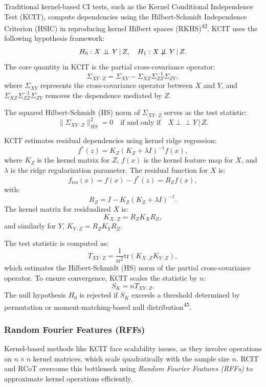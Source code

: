 \documentclass[
]{article}
\begin{document}
Traditional kernel-based CI tests, such as the Kernel Conditional
Independence Test (KCIT), compute dependencies using the Hilbert-Schmidt
Independence Criterion (HSIC) in reproducing kernel Hilbert spaces
(RKHS)\textsuperscript{42}. KCIT uses the following hypothesis
framework: \[
H_0: X \perp\!\!\!\perp Y \,|\, Z, \quad H_1: X \not\!\perp\!\!\!\perp Y \,|\, Z.
\] The core quantity in KCIT is the partial cross-covariance operator:
\[
\Sigma_{XY \cdot Z} = \Sigma_{XY} - \Sigma_{XZ} \Sigma_{ZZ}^{-1} \Sigma_{ZY},
\] where \(\Sigma_{XY}\) represents the cross-covariance operator
between \(X\) and \(Y\), and
\(\Sigma_{XZ} \Sigma_{ZZ}^{-1} \Sigma_{ZY}\) removes the dependence
mediated by \(Z\).

The squared Hilbert-Schmidt (HS) norm of \(\Sigma_{XY \cdot Z}\) serves
as the test statistic: \[
\|\Sigma_{XY \cdot Z}\|^2_{HS} = 0 \quad \text{if and only if} \quad X \perp\!\!\!\perp Y \,|\, Z.
\]

KCIT estimates residual dependencies using kernel ridge regression: \[
f^*(z) = K_Z (K_Z + \lambda I)^{-1} f(x),
\] where \(K_Z\) is the kernel matrix for \(Z\), \(f(x)\) is the kernel
feature map for \(X\), and \(\lambda\) is the ridge regularization
parameter. The residual function for \(X\) is: \[
f_\text{res}(x) = f(x) - f^*(z) = R_Z f(x),
\] with: \[
R_Z = I - K_Z (K_Z + \lambda I)^{-1}.
\] The kernel matrix for residualized \(X\) is: \[
K_{X \cdot Z} = R_Z K_X R_Z,
\] and similarly for \(Y\), \(K_{Y \cdot Z} = R_Z K_Y R_Z\).

The test statistic is computed as: \[
T_{XY \cdot Z} = \frac{1}{n^2} \text{tr}(K_{X \cdot Z} K_{Y \cdot Z}),
\] which estimates the Hilbert-Schmidt (HS) norm of the partial
cross-covariance operator. To ensure convergence, KCIT scales the
statistic by \(n\): \[
S_K = n T_{XY \cdot Z}.
\] The null hypothesis \(H_0\) is rejected if \(S_K\) exceeds a
threshold determined by permutation or moment-matching-based null
distribution\textsuperscript{45}.

\subsubsection{Random Fourier Features
(RFFs)}\label{random-fourier-features-rffs}

Kernel-based methods like KCIT face scalability issues, as they involve
operations on \(n \times n\) kernel matrices, which scale quadratically
with the sample size \(n\). RCIT and RCoT overcome this bottleneck using
\emph{Random Fourier Features (RFFs)} to approximate kernel operations
efficiently.
\end{document}
